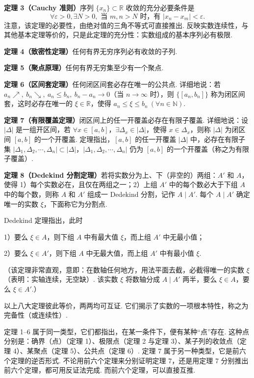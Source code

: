 \documentclass[UTF8,12pt,a4paper,fontset=fandol]{ctexart}
\begin{document}
\noindent\textbf{定理 3（Cauchy 准则）}\quad 序列 $\{x_n\}\subset\mathbb{R}$ 收敛的充分必要条件是
\[
  \forall \varepsilon>0,\exists N>0,\text{ 当 }m,n>N\text{ 时，有 }|x_n-x_m|<\varepsilon.
\]
注意，该定理的必要性，由绝对值的三角不等式可直接推出. 反映实数连续性，与其他基本定理等价的，只是此定理的充分性：实数组成的基本序列必有极限.

\noindent\textbf{定理 4（致密性定理）}\quad 任何有界无穷序列必有收敛的子列.

\noindent\textbf{定理 5（聚点原理）}\quad 任何有界无穷集至少有一个聚点.

\noindent\textbf{定理 6（区间套定理）}\quad 任何闭区间套必存在唯一的公共点. 详细地说：若 $a_n\nearrow,\ b_n\searrow,\ a_n\le b_n,\ b_n-a_n\to0$（当 $n\to\infty$ 时），则 $\{[a_n,b_n]\}$ 称为闭区间套，这时必存在唯一的 $\xi\in\mathbb{R}$，使得 $a_n\le \xi\le b_n\ (\forall n\in\mathbb{N})$.

\noindent\textbf{定理 7（有限覆盖定理）}\quad 闭区间上的任一开覆盖必存在有限子覆盖. 详细地说：设 $|\Delta|$ 是一组开区间，若 $\forall x\in[a,b]$，$\exists\Delta_x\in|\Delta|$，使得 $x\in\Delta_x$，则称 $|\Delta|$ 为闭区间 $[a,b]$ 的一个开覆盖. 定理指出，$[a,b]$ 的任一开覆盖 $|\Delta|$ 中，必存在有限子集 $|\Delta_1,\Delta_2,\cdots,\Delta_n|\subset|\Delta|$，$|\Delta_1,\Delta_2,\cdots,\Delta_n|$ 仍为 $[a,b]$ 的一个开覆盖（称之为有限子覆盖）.

\noindent\textbf{定理 8（Dedekind 分割定理）}\quad 若将实数分为上、下（非空的）两组：$A'$ 和 $A$，使得
1）每个实数必在，且仅在两组之一；2）上组 $A'$ 中的每个数必大于下组 $A$ 中的每个数，则称 $A$ 和 $A'$ 组成一 Dedekind 分割，记作 $A\mid A'$. 每个 $A\mid A'$ 确定唯一的实数 $\xi$，下面称它为分割点.

Dedekind 定理指出，此时

1）要么 $\xi\in A$，则下组 $A$ 中有最大值 $\xi$，而上组 $A'$ 中无最小值；

2）要么 $\xi\in A'$，则下组 $A$ 中无最大值，而上组 $A'$ 中有最小值 $\xi$.

（该定理非常直观，意即：在数轴任何地方，用法平面去截，必截得唯一的实数 $\xi$（表明：实轴连续，无空缺）. 该实数 $\xi$ 将数轴分成 $A\mid A'$ 两半，要么 $\xi\in A$，要么 $\xi\in A'$.）

以上八大定理彼此等价，两两均可互证. 它们揭示了实数的一项根本特性，称之为完备性（或连续性）.

定理 1--6 属于同一类型，它们都指出，在某一条件下，便有某种“点”存在. 这种点分别是：确界（点）（定理 1）、极限点（定理 2 与定理 3）、某子列的收敛点（定理 4）、某聚点（定理 5）、公共点（定理 6）. 定理 7 属于另一种类型，它是前六个定理的逆否形式. 不论用前六个定理来分别证明定理 7，还是用定理 7 分别推出前六个定理，都可用反证法完成. 而前六个定理，可以直接互推.
\end{document}
